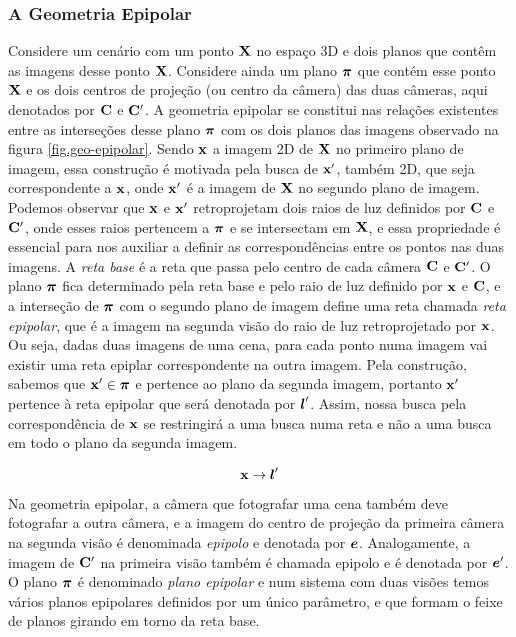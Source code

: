\subsubsection{A Geometria Epipolar}

Considere um cenário com um ponto $\mathbf{X}$ no espaço 3D e dois planos que contêm as imagens desse ponto $\mathbf{X}$. Considere ainda um plano $\boldsymbol{\pi}$ que contém esse ponto $\mathbf{X}$ e os dois centros de projeção (ou centro da câmera) das duas câmeras, aqui denotados por ${\bf C}$ e ${\bf C}'$. A geometria epipolar se constitui nas relações existentes entre as interseções desse plano $\boldsymbol{\pi}$ com os dois planos das imagens observado na figura \ref{fig.geo-epipolar}. Sendo $\mathbf{x}$ a imagem 2D de $\mathbf{X}$ no primeiro plano de imagem, essa construção é motivada pela busca de $\mathbf{x}'$, também 2D, que seja correspondente a $\mathbf{x}$, onde $\mathbf{x}'$ é a imagem de $\mathbf{X}$ no segundo plano de imagem. Podemos observar que $\mathbf{x}$ e $\mathbf{x}'$ retroprojetam dois raios de luz definidos por ${\bf C}$ e ${\bf C}'$, onde esses raios pertencem a $\boldsymbol{\pi}$ e se intersectam em $\mathbf{X}$, e essa propriedade é essencial para nos auxiliar a definir as correspondências entre os pontos nas duas imagens. A \textit{reta base} é a reta que passa pelo centro de cada câmera ${\bf C}$ e ${\bf C}'$. O plano $\boldsymbol{\pi}$ fica determinado pela reta base e pelo raio de luz definido por $\mathbf{x}$ e ${\bf C}$, e a interseção de $\boldsymbol{\pi}$ com o segundo plano de imagem define uma reta chamada \textit{reta epipolar}, que é a imagem na segunda visão do raio de luz retroprojetado por $\mathbf{x}$. Ou seja, dadas duas imagens de uma cena, para cada ponto numa imagem vai existir uma reta epiplar correspondente na outra imagem. Pela construção, sabemos que $\mathbf{x}'\in\boldsymbol{\pi}$ e pertence ao plano da segunda imagem, portanto $\mathbf{x}'$ pertence à reta epipolar que será denotada por $\boldsymbol{l}'$. Assim, nossa busca pela correspondência de $\mathbf{x}$ se restringirá a uma busca numa reta e não a uma busca em todo o plano da segunda imagem. 

\begin{equation*}
\mathbf{x}\rightarrow\boldsymbol{l}'
\end{equation*}

Na geometria epipolar, a câmera que fotografar uma cena também deve fotografar a outra câmera, e a imagem do centro de projeção da primeira câmera na segunda visão é denominada \textit{epipolo} e denotada por $\boldsymbol{e}$. Analogamente, a imagem de ${\bf C}'$ na primeira visão também é chamada epipolo e é denotada por $\boldsymbol{e}'$.
O plano $\boldsymbol{\pi}$ é denominado \textit{plano epipolar} e num sistema com duas visões temos vários planos epipolares definidos por um único parâmetro, e que formam o feixe de planos girando em torno da reta base.

